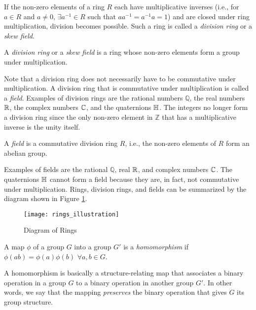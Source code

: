 If the non-zero elements of a ring $R$ each have multiplicative inverses (i.e., for $a\in R$ and $a\neq 0$, $\exists a^{-1} \in R$ such that $aa^{-1}=a^{-1}a=1$) and are closed under ring multiplication, division becomes possible. Such a ring is called a \emph{division ring} or a \emph{skew field}.

\begin{definition} \label{def:skewfield}
	\cite{fraleigh} A \emph{division ring} or a \emph{skew field} is a ring whose non-zero elements form a group under multiplication.
\end{definition}

Note that a division ring does not necessarily have to be commutative under multiplication. A division ring that is commutative under multiplication is called a \emph{field}. Examples of division rings are the rational numbers $\mathbb{Q}$, the real numbers $\operatorname{\mathbb{R}}$, the complex numbers $\operatorname{\mathbb{C}}$, and the quaternions $\operatorname{\mathbb{H}}$. The integers no longer form a division ring since the only non-zero element in $\mathbb{Z}$ that has a multiplicative inverse is the unity itself.

\begin{definition}[Field] \label{def:field}
	\cite{fraleigh} A \emph{field} is a commutative division ring $R$, i.e., the non-zero elements of $R$ form an abelian group.
\end{definition}

Examples of fields are the rational $\mathbb{Q}$, real $\operatorname{\mathbb{R}}$, and complex numbers $\operatorname{\mathbb{C}}$. The quaternions $\operatorname{\mathbb{H}}$ cannot form a field because they are, in fact, not commutative under multiplication. Rings, division rings, and fields can be summarized by the diagram shown in Figure \ref{fig:rings}.

\begin{figure}[H]
\centering
	\texttt{[image: rings\_illustration]}
	\caption{Diagram of Rings}
	\label{fig:rings}
\end{figure}

\begin{definition}[Homomorphism]
	\cite{fraleigh} A map $\phi$ of a group $G$ into a group $G'$ is a \emph{homomorphism} if $\phi(ab)=\phi(a)\phi(b)$ $\forall a,b \in G$.
\end{definition}

A homomorphism is basically a structure-relating map that associates a binary operation in a group $G$ to a binary operation in another group $G'$. In other words, we say that the mapping \emph{preserves} the binary operation that gives $G$ its group structure. 

